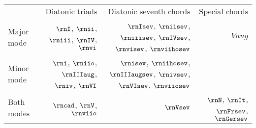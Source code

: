 \begin{tabular}{lrrr}
            & Diatonic triads                                & Diatonic seventh chords                                                       & Special chords        \\
Major mode & $\rnI$, $\rnii$, $\rniii$, $\rnIV$, $\rnvi$     & $\rnIsev$, $\rniisev$, $\rniiisev$, $\rnIVsev$, $\rnvisev$, $\rnviihosev$     & $Vaug$                \\
Minor mode & $\rni$, $\rniio$, $\rnIIIaug$, $\rniv$, $\rnVI$ & $\rnisev$, $\rniihosev$, $\rnIIIaugsev$, $\rnivsev$, $\rnVIsev$, $\rnviiosev$ &                       \\
Both modes & $\rncad$, $\rnV$, $\rnviio$                     & $\rnVsev$                                                                     & $\rnN$, $\rnIt$, $\rnFrsev$, $\rnGersev$
\end{tabular}
